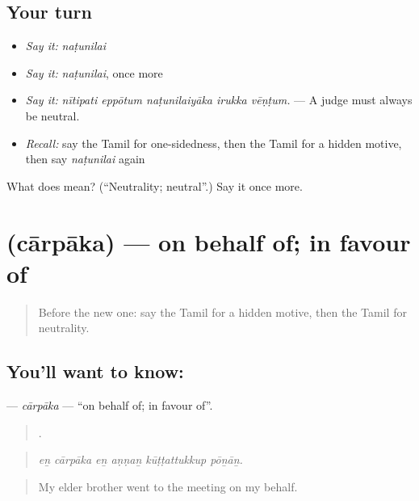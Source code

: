 \subsection*{Your turn}
\begin{itemize}
\raggedright
  \item \emph{Say it:} \emph{naṭunilai}
  \item \emph{Say it:} \emph{naṭunilai}, once more
  \item \emph{Say it:} \emph{nītipati eppōtum naṭunilaiyāka irukka vēṇṭum.} — A judge must always be neutral.
  \item \emph{Recall:} say the Tamil for one-sidedness, then the Tamil for a hidden motive, then say \emph{naṭunilai} again
\end{itemize}

\begin{tcolorbox}[breakable,colback=teal!4,colframe=teal!35!black,title={Before you move on}]
What does  mean? (\textquotedblleft{}Neutrality; neutral\textquotedblright{}.) Say it once more.
\end{tcolorbox}
\section[\texorpdfstring{\ta{சார்பாக} (cārpāka)}{சார்பாக (cārpāka)}]{ (cārpāka) — on behalf of; in favour of}

\label{lesson:TA-C394-carpaka}



\begin{quote}
Before the new one: say the Tamil for a hidden motive, then the Tamil for neutrality.
\end{quote}

\subsection*{You'll want to know: }
\textbf{} — \emph{cārpāka} — \textquotedblleft{}on behalf of; in favour of\textquotedblright{}.

\begin{quote}
     .
\end{quote}

\begin{quote}
\emph{eṉ cārpāka eṉ aṇṇaṉ kūṭṭattukkup pōṉāṉ.}
\end{quote}

\begin{quote}
My elder brother went to the meeting on my behalf.
\end{quote}

